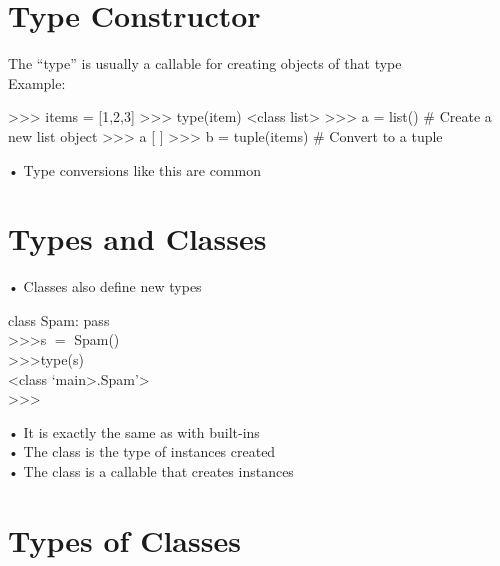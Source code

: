 \documentclass[
  letterpaper,
  DIV=11,
  numbers=noendperiod]{scrreprt}
\newenvironment{Shaded}{\begin{snugshade}}{\end{snugshade}}
\newcommand{\NormalTok}[1]{\textcolor[rgb]{0.00,0.23,0.31}{#1}}
\begin{document}

\chapter{Type Constructor}\label{type-constructor}

The ``type'' is usually a callable for creating objects of that type\\
Example:

\begin{Shaded}
\begin{Highlighting}[]
\NormalTok{\textgreater{}\textgreater{}\textgreater{} items = [1,2,3]  }
\NormalTok{\textgreater{}\textgreater{}\textgreater{} type(item)  }
\NormalTok{\textless{}class \textquotesingle{}list\textquotesingle{}\textgreater{}  }
\NormalTok{\textgreater{}\textgreater{}\textgreater{} a = list()  \# Create a new list object  }
\NormalTok{\textgreater{}\textgreater{}\textgreater{} a  }
\NormalTok{[ ]  }
\NormalTok{\textgreater{}\textgreater{}\textgreater{} b = tuple(items)  \# Convert to a tuple }
\end{Highlighting}
\end{Shaded}

• Type conversions like this are common


\chapter{Types and Classes}\label{types-and-classes}

• Classes also define new types

class Spam: pass\\
\textgreater\textgreater\textgreater s \(=\) Spam()\\
\textgreater\textgreater\textgreater type(s)\\
\textless class `main\textgreater.Spam'\textgreater{}\\
\textgreater\textgreater\textgreater{}

• It is exactly the same as with built-ins\\
• The class is the type of instances created\\
• The class is a callable that creates instances


\chapter{Types of Classes}\label{types-of-classes}
\end{document}
